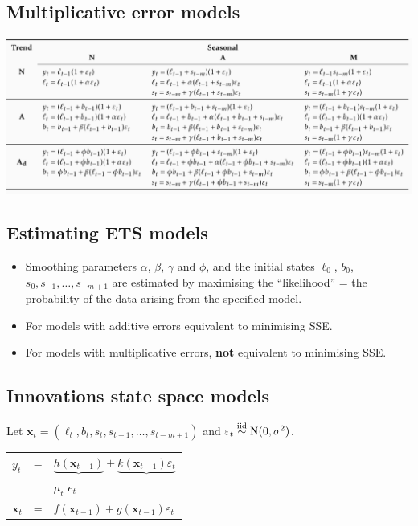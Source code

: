 \documentclass[]{book}
\providecommand{\tightlist}{%
  \setlength{\itemsep}{0pt}\setlength{\parskip}{0pt}}
\begin{document}
\hypertarget{multiplicative-error-models}{%
\subsection{Multiplicative error models}\label{multiplicative-error-models}}

\includegraphics[width=1\textwidth,height=1\textheight]{fig/fig_7_ets_multi.png}

\hypertarget{estimating-ets-models}{%
\subsection{Estimating ETS models}\label{estimating-ets-models}}

\begin{itemize}
\tightlist
\item
  Smoothing parameters \(\alpha\), \(\beta\), \(\gamma\) and \(\phi\), and the initial states \(\ell_0\), \(b_0\), \(s_0,s_{-1},\dots,s_{-m+1}\) are estimated by maximising the ``likelihood'' = the probability of the data arising from the specified model.
\item
  For models with additive errors equivalent to minimising SSE.
\item
  For models with multiplicative errors, \textbf{not} equivalent to minimising SSE.
\end{itemize}

\hypertarget{innovations-state-space-models-1}{%
\subsection{Innovations state space models}\label{innovations-state-space-models-1}}

Let \(\mathbf{x}_t = (\ell_t, b_t, s_t, s_{t-1}, \dots, s_{t-m+1})\) and \(\varepsilon_t\stackrel{\mbox{\scriptsize iid}}{\sim} \mbox{N}(0,\sigma^2)\).

\begin{table}[H]
\begin{tabular}{lcl}
$y_t$ &=& $\underbrace{h(\mathbf{x}_{t-1})} +
\underbrace{k(\mathbf{x}_{t-1})\varepsilon_t}$\\
&& \hspace*{0.5cm}$\mu_t$ \hspace*{1.45cm} $e_t$ \\[0.2cm]
$\mathbf{x}_t$ &=& $f(\mathbf{x}_{t-1}) +
g(\mathbf{x}_{t-1})\varepsilon_t$\\
\end{tabular}
\end{table}
\end{document}

